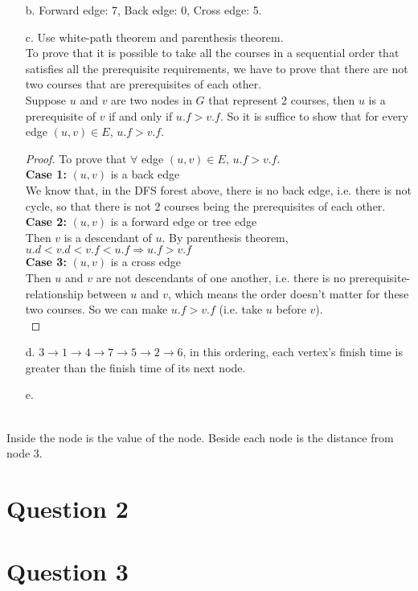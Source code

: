 \documentclass[10pt]{article}
\begin{document}
\begin{itemize}
\item[b.] Forward edge: 7, Back edge: 0, Cross edge: 5.
\item[c.] Use white-path theorem and parenthesis theorem.\\
To prove that it is possible to take all the courses
in a sequential order that satisfies all the prerequisite requirements, we have to prove that there are not two courses that are prerequisites of each other. \\
Suppose $u$ and $v$ are two nodes in $G$ that represent 2 courses, then $u$ is a prerequisite of $v$ if and only if $u.f>v.f$. So it is suffice to show that for every edge $(u,v)\in E$, $u.f>v.f$.
\begin{proof} To prove that $\forall$ edge $(u,v)\in E$, $u.f>v.f$.\\
\textbf{Case 1:} $(u, v)$ is a back edge\\
We know that, in the DFS forest above, there is no back edge, i.e. there is not cycle, so that there is not 2 courses being the prerequisites of each other.\\
\textbf{Case 2:} $(u,v)$ is a forward edge or tree edge\\
Then $v$ is a descendant of $u$. By parenthesis theorem, $u.d<v.d<v.f<u.f\Rightarrow u.f>v.f$\\
\textbf{Case 3:} $(u,v)$ is a cross edge\\
Then $u$ and $v$ are not descendants of one another, i.e. there is no prerequisite-relationship between $u$ and $v$, which means the order doesn't matter for these two courses. So we can make $u.f>v.f$ (i.e. take $u$ before $v$).\\
\end{proof}
\item[d.] $3\rightarrow 1\rightarrow 4\rightarrow 7\rightarrow 5\rightarrow 2\rightarrow 6$, in this ordering, each vertex's finish time is greater than the finish time of its next node.
\item[e.]
\end{itemize}
\\
Inside the node is the value of the node. Beside each node is the distance from node 3.




\section*{Question 2}


\section*{Question 3}
\end{document}

